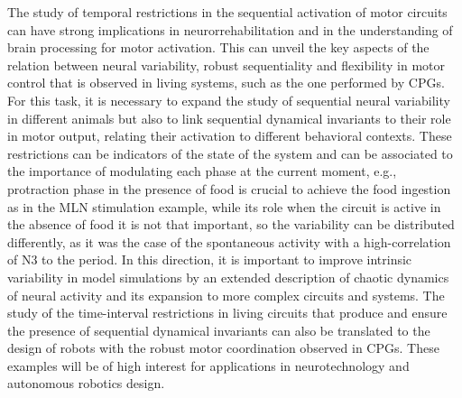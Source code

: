 The study of temporal restrictions in the sequential activation of motor circuits can have strong implications in neurorrehabilitation and in the understanding of brain processing for motor activation. This can unveil the key aspects of the relation between neural variability, robust sequentiality and flexibility in motor control that is observed in living systems, such as the one performed by CPGs. For this task, it is necessary to expand the study of sequential neural  variability in different animals but also to link sequential dynamical invariants to their role in motor output, relating their activation to different behavioral contexts. These restrictions can be indicators of the state of the system and can be associated to the importance of modulating each phase at the current moment, e.g., protraction phase in the presence of food is crucial to achieve the food ingestion as in the MLN stimulation example, while its role when the circuit is active in the absence of food it is not that important, so the variability can be distributed differently, as it was the case of the spontaneous activity with a high-correlation of N3 to the period. In this direction, it is important to improve intrinsic variability in model simulations by an extended description of chaotic dynamics of neural activity and its expansion to more complex circuits and systems. The study of the time-interval restrictions in living circuits that produce and ensure the presence of sequential dynamical invariants can also be translated to the design of robots with the robust motor coordination observed in CPGs. These examples will be of high interest for applications in neurotechnology and autonomous robotics design. 

